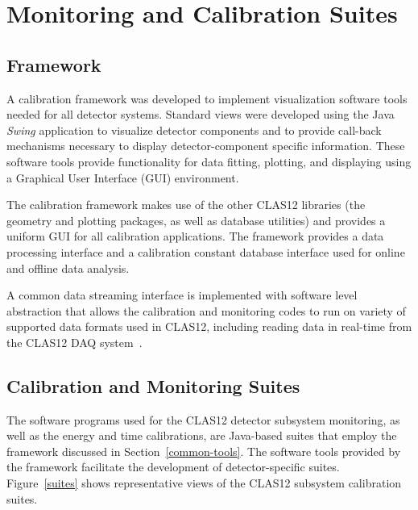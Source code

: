 \section{Monitoring and Calibration Suites}
\label{sec:calibration}

\subsection{Framework}

A calibration framework was developed to implement visualization software tools needed for all detector
systems. Standard views were developed using the Java {\it Swing} application to visualize detector components
and to provide call-back mechanisms necessary to display detector-component specific information.  These
software tools provide functionality for data fitting, plotting, and displaying using a Graphical User Interface
(GUI) environment.

The calibration framework makes use of the other CLAS12 libraries (the geometry and plotting packages, as well
as database utilities) and provides a uniform GUI for all calibration applications. The framework provides a data
processing interface and a calibration constant database interface used for online and offline data analysis.

A common data streaming interface is implemented with software level abstraction that allows the calibration and
monitoring codes to run on variety of supported data formats used in CLAS12, including reading data in real-time
from the CLAS12 DAQ system~\cite{daq-nim}.

\subsection{Calibration and Monitoring Suites}

The software programs used for the CLAS12 detector subsystem monitoring, as well as the energy and time
calibrations,  are Java-based suites that employ the framework discussed in Section~\ref{common-tools}. The
software tools provided by the framework facilitate the development of detector-specific suites.
Figure~\ref{suites} shows representative views of the CLAS12 subsystem calibration suites.

